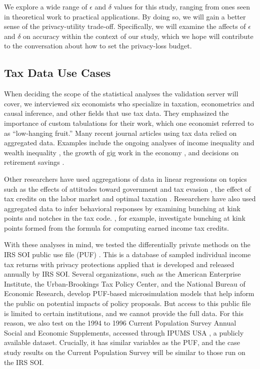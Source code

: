 We explore a wide range of $\epsilon$ and $\delta$ values for this study, ranging from ones seen in theoretical work to practical applications. By doing so, we will gain a better sense of the privacy-utility trade-off. Specifically, we will examine the affects of $\epsilon$ and $\delta$ on accuracy within the context of our study, which we hope will contribute to the conversation about how to set the privacy-loss budget.

\subsection{Tax Data Use Cases}\label{subsec:data}
When deciding the scope of the statistical analyses the validation server will cover, we interviewed six economists who specialize in taxation, econometrics and causal inference, and other fields that use tax data. They emphasized the importance of custom tabulations for their work, which one economist referred to as ``low-hanging fruit.'' Many recent journal articles using tax data relied on aggregated data. Examples include the ongoing analyses of income inequality \citep{auten2018income} and wealth inequality \citep{smith2019top}, the growth of gig work in the economy \citep{collins2019gig}, and decisions on retirement savings \citep{brady2020reconciling}.

Other researchers have used aggregations of data in linear regressions on topics such as the effects of attitudes toward government and tax evasion \citep{cullen2021political}, the effect of tax credits on the labor market \citep{tong2014impact} and optimal taxation \citep{piketty2014optimal}. Researchers have also used aggregated data to infer behavioral responses by examining bunching at kink points \citep{chetty2011adjustment} and notches \citep{kleven2013using} in the tax code. \citet{mortenson2020bunching}, for example, investigate bunching at kink points formed from the formula for computing earned income tax credits.

With these analyses in mind, we tested the differentially private methods on the IRS SOI public use file (PUF) \citep{barrientos2021}. This is a database of sampled individual income tax returns with privacy protections applied that is developed and released annually by IRS SOI. Several organizations, such as the American Enterprise Institute, the Urban-Brookings Tax Policy Center, and the National Bureau of Economic Research, develop PUF-based microsimulation models that help inform the public on potential impacts of policy proposals. But access to this public file is limited to certain institutions, and we cannot provide the full data. For this reason, we also test on the 1994 to 1996 Current Population Survey Annual Social and Economic Supplements, accessed through IPUMS USA \cite{ruggles2021cps}, a publicly available dataset. Crucially, it has similar variables as the PUF, and the case study results on the Current Population Survey will be similar to those run on the IRS SOI.

